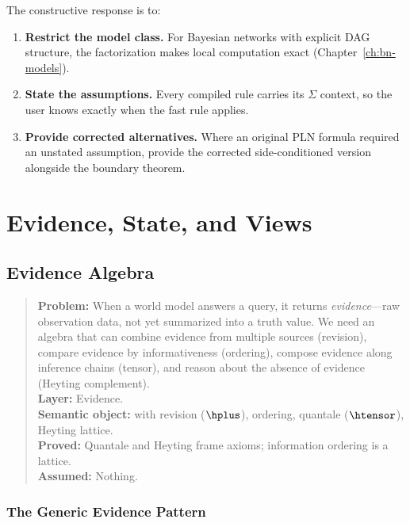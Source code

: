 \documentclass[11pt,openany]{report}
\begin{document}
The constructive response is to:
\begin{enumerate}
\item \textbf{Restrict the model class.}  For Bayesian networks with
  explicit DAG structure, the factorization makes local computation
  exact (Chapter~\ref{ch:bn-models}).
\item \textbf{State the assumptions.}  Every compiled rule carries its
  $\Sigma$ context, so the user knows exactly when the fast rule applies.
\item \textbf{Provide corrected alternatives.}  Where an original PLN
  formula required an unstated assumption, provide the corrected
  side-conditioned version alongside the boundary theorem.
\end{enumerate}


\part{Evidence, State, and Views}
\label{part:evidence}

\chapter{Evidence Algebra}
\label{ch:evidence}

\begin{quote}\small
\textbf{Problem:} When a world model answers a query, it returns
\emph{evidence}---raw observation data, not yet summarized into a truth
value.  We need an algebra that can combine evidence from multiple
sources (revision), compare evidence by informativeness (ordering),
compose evidence along inference chains (tensor), and reason about the
absence of evidence (Heyting complement).\\[4pt]
\textbf{Layer:} Evidence.\\
\textbf{Semantic object:} \Evidence{} with revision ($\hplus$), ordering, quantale ($\htensor$), Heyting lattice.\\
\textbf{Proved:} Quantale and Heyting frame axioms; information ordering is a lattice.\\
\textbf{Assumed:} Nothing.
\end{quote}

\section{The Generic Evidence Pattern}
\end{document}
